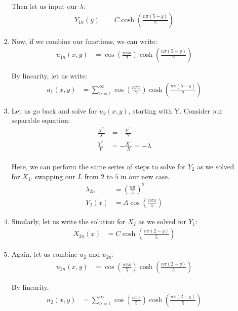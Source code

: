 \documentclass{article}
\begin{document}
\begin{enumerate}
\begin{enumerate}
  Then let us input our $\lambda$:
  \begin{align}
    Y_{1n}(y) & = C \cosh\left(\frac{n \pi (5 - y)}{2}\right)
  \end{align}

  \item Now, if we combine our functions, we can write:
  \begin{align}
    u_{1n}(x, y) & =
    \cos\left(\frac{n \pi x}{2}\right)
    \cosh\left(\frac{n \pi(5 - y)}{2}\right)
  \end{align}

  By linearity, let us write:
  \begin{align}
    u_{1}(x, y) & = \sum^\infty_{n = 1}
    \cos\left(\frac{n \pi x}{2}\right)
    \cosh\left(\frac{n \pi(5 - y)}{2}\right)
  \end{align}

  \setcounter{enumii}{1}
  \item Let us go back and solve for $u_{2}(x, y)$, starting with Y. Consider our separable equation:
  \begin{align}
    \frac{X^{\prime\prime}}{X} & = - \frac{Y^{\prime\prime}}{Y}\\
    \frac{Y^{\prime\prime}}{Y} & = - \frac{X^{\prime\prime}}{X} = -\lambda\\
  \end{align}

  Here, we can perform the same series of steps to solve for $Y_2$ as we solved for $X_1$, swapping our $L$ from $2$ to $5$ in our new case.
  \begin{align}
    \lambda_{2n} & = \left(\frac{n \pi}{5}\right)^2\\
    Y_2(x) & = A \cos\left(\frac{n \pi x}{5}\right)
  \end{align}
  \item Similarly, let us write the solution for $X_{2}$ as we solved for $Y_{1}$:
  \begin{align}
    X_{2n}(x) & = C \cosh\left(\frac{n \pi(2 - y)}{5}\right)
  \end{align}
  \item Again, let us combine $u_2$ and $u_{2n}$:
  \begin{align}
    u_{2n}(x, y) & = \cos\left(\frac{n \pi x}{5}\right) \cosh\left(\frac{n \pi(2 - y)}{5}\right)
  \end{align}

  By linearity,
  \begin{align}
    u_{2}(x, y) & = \sum^\infty_{n = 1} \cos\left(\frac{n \pi x}{5}\right) \cosh\left(\frac{n \pi(2 - y)}{5}\right)
  \end{align}


\end{enumerate}
\end{enumerate}
\end{document}
